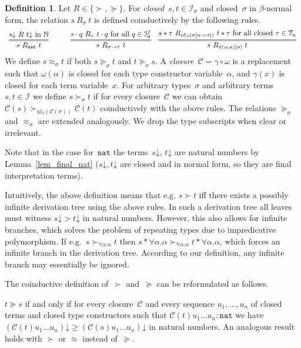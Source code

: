 \documentclass[a4paper,UKenglish,cleveref,autoref,numberwithinsect]{lipics-v2019}
\theoremstyle{definition}
\newtheorem{defn}[theorem]{Definition}
\newcommand{\Iterms}{\mathcal{I}}
\newcommand{\arrtype}{\rightarrow}
\newcommand{\app}[2]{#1 \cdot #2}
\newcommand{\tapp}[2]{#1 * #2}
\newcommand{\subst}[2]{#1:=#2}
\newcommand{\nat}{\mathtt{nat}}
\newcommand{\Tc}{\mathcal{T}}
\newcommand{\cl}{\mathcal{C}}
\newcommand{\nf}{\mathrm{nf}}
\newcommand{\da}{\mathord{\downarrow}}
\begin{document}
\begin{defn}\label{def:succ}
            \label{def_closure}
  Let $R \in \{ \succ,\succeq \}$. For \emph{closed}~$s,t\in\Iterms_\sigma$
  and closed~$\sigma$ in $\beta$-normal form, the relation
  $s\ R_{\sigma}\ t$ is defined coinductively by the following rules.
  \[
  \begin{array}{ccc}
    \infer={s\ R_\nat\ t}{s\da\ R\ t\da \text{ in }\mathbb{N}} \quad&\quad
    \infer={s\ R_{\sigma\arrtype\tau}\ t}{\app{s}{q}\ R_{\tau}\ \app{t}{q} \text{ for all } q \in \Iterms^f_\sigma} &
    \infer={s\ R_{\forall(\alpha:\kappa)[\sigma]}\ t}{\tapp{s}{\tau}\ R_{\nf_\beta(\sigma[\subst{\alpha}{\tau}])}\ \tapp{t}{\tau} \text{ for all closed } \tau \in \Tc_{\kappa}}
  \end{array}
  \]
  We define $s \approx_\sigma t$ if both $s \succeq_\sigma t$ and $t
  \succeq_\sigma s$.
  A \emph{closure}~$\cl = \gamma \circ \omega$ is a
  replacement such that $\omega(\alpha)$ is closed for each
  type constructor variable~$\alpha$, and $\gamma(x)$ is closed for
  each term variable~$x$.
  For arbitrary types~$\sigma$ and arbitrary terms $s,t \in \Iterms$
  we define $s \succ_\sigma t$ if for every closure~$\cl$ we can
  obtain $\cl(s) \succ_{\nf_\beta(\cl(\sigma))} \cl(t)$ coinductively
  with the above rules. The relations $\succeq_\sigma$ and
  $\approx_\sigma$ are extended analogously. We drop the type
  subscripts when clear or irrelevant.
\end{defn}

Note that in the case for~$\nat$ the terms~$s\da$, $t\da$ are natural
numbers by Lemma~\ref{lem_final_nat} ($s\da,t\da$ are closed and in
normal form, so they are final interpretation terms).

Intuitively, the above definition means that e.g. $s \succ t$ iff
there exists a possibly infinite derivation tree using the above
rules. In such a derivation tree all leaves must witness $s\da > t\da$
in natural numbers. However, this also allows for infinite branches,
which solves the problem of repeating types due to impredicative
polymorphism. If e.g.~$s \succ_{\forall \alpha . \alpha} t$ then
$\tapp{s}{\forall\alpha.\alpha} \succ_{\forall \alpha . \alpha}
\tapp{t}{\forall\alpha.\alpha}$, which forces an infinite branch in
the derivation tree. According to our definition, any infinite branch
may essentially be ignored.

The coinductive definition of~$\succ$ and~$\succeq$ can be
reformulated as follows.

\begin{lemma}\label{lem_succ_explicit}
  $t \succeq s$ if and only if for every closure~$\cl$ and every
  sequence $u_1,\ldots,u_n$ of closed terms and closed type
  constructors such that $\cl(t) u_1 \ldots u_n : \nat$ we have
  $(\cl(t) u_1 \ldots u_n)\da \ge (\cl(s) u_1 \ldots u_n)\da$ in
  natural numbers. An analogous result holds with $\succ$ or $\approx$
  instead of~$\succeq$.
\end{lemma}
\end{document}
